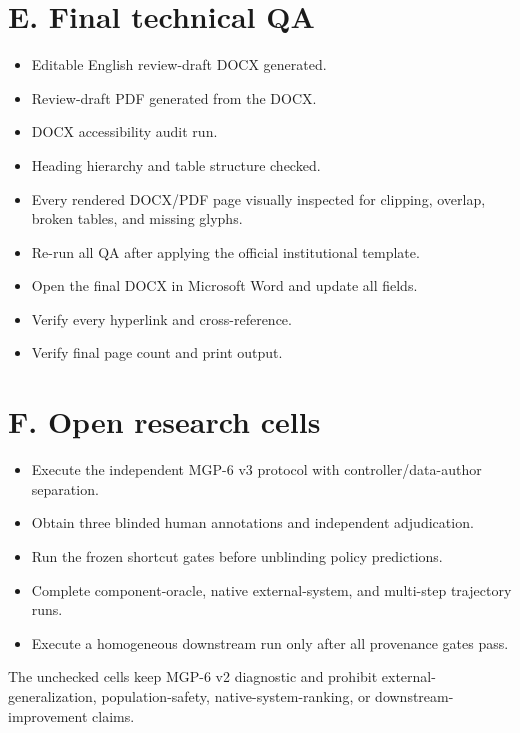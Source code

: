 \section{E. Final technical QA}\label{e.-final-technical-qa}

\begin{itemize}
\tightlist
\item[$\boxtimes$]
  Editable English review-draft DOCX generated.
\item[$\boxtimes$]
  Review-draft PDF generated from the DOCX.
\item[$\boxtimes$]
  DOCX accessibility audit run.
\item[$\boxtimes$]
  Heading hierarchy and table structure checked.
\item[$\boxtimes$]
  Every rendered DOCX/PDF page visually inspected for clipping, overlap,
  broken tables, and missing glyphs.
\item[$\square$]
  Re-run all QA after applying the official institutional template.
\item[$\square$]
  Open the final DOCX in Microsoft Word and update all fields.
\item[$\square$]
  Verify every hyperlink and cross-reference.
\item[$\square$]
  Verify final page count and print output.
\end{itemize}

\section{F. Open research cells}\label{f.-open-research-cells}

\begin{itemize}
\tightlist
\item[$\square$]
  Execute the independent MGP-6 v3 protocol with controller/data-author
  separation.
\item[$\square$]
  Obtain three blinded human annotations and independent adjudication.
\item[$\square$]
  Run the frozen shortcut gates before unblinding policy predictions.
\item[$\square$]
  Complete component-oracle, native external-system, and multi-step
  trajectory runs.
\item[$\square$]
  Execute a homogeneous downstream run only after all provenance gates
  pass.
\end{itemize}

The unchecked cells keep MGP-6 v2 diagnostic and prohibit
external-generalization, population-safety, native-system-ranking, or
downstream-improvement claims.
